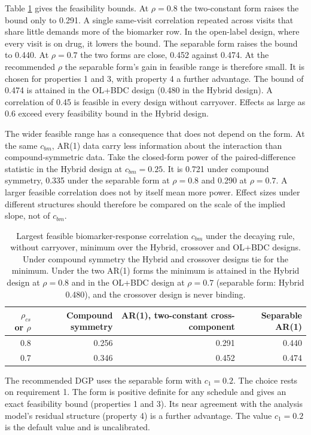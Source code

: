 \documentclass[
  11pt,
]{article}
\begin{document}
Table \ref{tab:ceilings} gives the feasibility bounds. At
\(\rho = 0.8\) the two-constant form raises the bound only to
0.291. A single same-visit correlation repeated across visits that
share little demands more of the biomarker row. In the open-label
design, where every visit is on drug, it lowers the bound. The
separable form raises the bound to 0.440. At \(\rho = 0.7\) the two
forms are close, 0.452 against 0.474. At the recommended \(\rho\) the
separable form's gain in feasible range is therefore small. It is
chosen for properties 1 and 3, with property 4 a further advantage.
The bound of 0.474 is attained in the OL+BDC design (0.480 in the
Hybrid design). A correlation of 0.45 is feasible in every design
without carryover. Effects as large as 0.6 exceed every feasibility
bound in the Hybrid design.

The wider feasible range has a consequence that does not depend on
the form. At the same \(c_{bm}\), AR(1) data carry less information
about the interaction than compound-symmetric data. Take the
closed-form power of the paired-difference statistic in the Hybrid
design at \(c_{bm} = 0.25\). It is 0.721 under compound symmetry,
0.335 under the separable form at \(\rho = 0.8\) and 0.290 at
\(\rho = 0.7\). A larger feasible correlation does not by itself mean
more power. Effect sizes under different structures should therefore
be compared on the scale of the implied slope, not of \(c_{bm}\).

\begin{table}

\caption{\label{tab:ceilings}Largest feasible biomarker-response correlation $c_{bm}$ under the decaying rule, without carryover, minimum over the Hybrid, crossover and OL+BDC designs. Under compound symmetry the Hybrid and crossover designs tie for the minimum. Under the two AR(1) forms the minimum is attained in the Hybrid design at $\rho = 0.8$ and in the OL+BDC design at $\rho = 0.7$ (separable form: Hybrid 0.480), and the crossover design is never binding.}
\centering
\begin{tabular}[t]{rrrr}
\toprule
$\rho_{cs}$ or $\rho$ & Compound symmetry & AR(1), two-constant cross-component & Separable AR(1)\\
\midrule
0.8 & 0.256 & 0.291 & 0.440\\
0.7 & 0.346 & 0.452 & 0.474\\
\bottomrule
\end{tabular}
\end{table}

The recommended DGP uses the separable form with \(c_1 = 0.2\). The
choice rests on requirement 1. The form is positive definite for any
schedule and gives an exact feasibility bound (properties 1 and 3).
Its near agreement with the analysis model's residual structure
(property 4) is a further advantage. The value \(c_1 = 0.2\) is the
default value and is uncalibrated.
\end{document}
